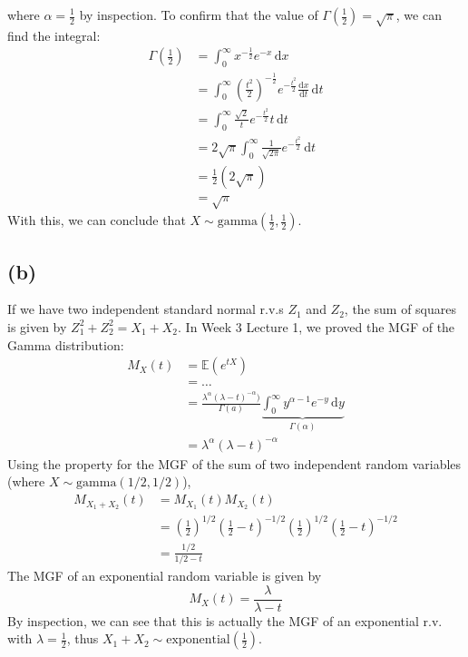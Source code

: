 \documentclass[12pt]{article}
\begin{document}
\noindent where $\alpha = \frac{1}{2}$ by inspection. To confirm that the value of $\Gamma(\frac{1}{2}) = \sqrt{\pi}$, we can find the integral: \begin{align*}
    \Gamma\left(\frac{1}{2}\right) &= \int_{0}^{\infty} x^{-\frac{1}{2}}e^{-x} \, \mathrm{d}x \\ 
    &= \int_{0}^{\infty} \left( \frac{t^{2}}{2} \right)^{-\frac{1}{2}}e^{-\frac{t^{2}}{2}} \frac{\mathrm{d}x}{\mathrm{d}t} \, \mathrm{d}t \\ 
    &= \int_{0}^{\infty} \frac{\sqrt{2}}{t}e^{-\frac{t^{2}}{2}} t\, \mathrm{d}t \\ 
    &= 2\sqrt{\pi} \int_{0}^{\infty} \frac{1}{\sqrt{2\pi}}e^{-\frac{t^{2}}{2}} \, \mathrm{d}t \\ 
    &= \frac{1}{2}(2\sqrt{\pi}) \\ 
    &= \sqrt{\pi}
\end{align*} With this, we can conclude that $\boxed{X \sim \text{gamma}\left(\frac{1}{2}, \frac{1}{2}\right)}$. 

\subsection*{(b)}

If we have two independent standard normal r.v.s $Z_{1}$ and $Z_{2}$, the sum of squares is given by $Z_{1}^{2}+ Z_{2}^{2} = X_{1} + X_{2}$. In Week 3 Lecture 1, we proved the MGF of the Gamma distribution: \begin{align*}
    M_X (t) &= \mathbb{E}(e^{tX}) \\ 
    &= \dots \\ 
    &= \frac{\lambda^{\alpha}(\lambda - t)^{-\alpha})}{\Gamma (a)} \underbrace{\int_{0}^{\infty} y^{\alpha-1}e^{-y} \, \mathrm{d}y}_{\Gamma (\alpha)} \\ 
    &= \lambda^{\alpha}(\lambda - t)^{-\alpha}
\end{align*} Using the property for the MGF of the sum of two independent random variables (where $X \sim \text{gamma}(1 / 2 , 1 / 2)$), \begin{align*}
    M_{X_{1} + X_{2}}(t) &= M_{X_{1}}  (t) M_{X_{2}} (t) \\ 
    &= \left( \frac{1}{2} \right)^{1 / 2} \left( \frac{1}{2} - t \right)^{- 1 / 2} \left( \frac{1}{2} \right)^{1 / 2} \left( \frac{1}{2} - t \right)^{- 1 / 2} \\ 
    &= \frac{1 / 2}{1 / 2 - t}
\end{align*} The MGF of an exponential random variable is given by \begin{equation*}
    M_X (t) = \frac{\lambda}{\lambda - t}
\end{equation*} By inspection, we can see that this is actually the MGF of an exponential r.v. with $\lambda = \frac{1}{2}$, thus $X_{1} + X_{2} \sim \text{exponential}(\frac{1}{2})$.    
\end{document}

